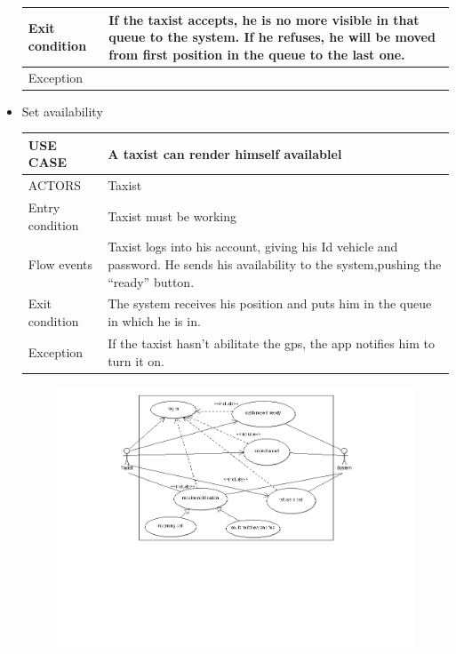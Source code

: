\begin{itemize}
\begin{center}
\begin{tabular}{ | l | p{11cm} |}
  	   Exit condition & If the taxist accepts, he is no more visible in that queue to the system.
If he refuses, he will be moved from first position in the queue to the last one.\\ \hline
  	   Exception &  \\ \hline
    \end{tabular}
\end{center}
\item Set availability
	\begin{center}
   	 \begin{tabular}{ | l | p{11cm} |}
   	 \hline
   	USE CASE & A taxist can render himself availablel\\ \hline
   	 ACTORS & Taxist \\ \hline
    	 Entry condition & Taxist must be working \\ \hline
    	 Flow events & Taxist logs into his account, giving his Id vehicle and password.
He sends his availability to the system,pushing the “ready” button.\\ \hline
  	   Exit condition & The system receives his position and puts him in the queue in which he is in.\\ \hline
  	   Exception &  If the taxist hasn’t abilitate the gps, the app notifies him to turn it on.\\ \hline
    \end{tabular}
\end{center}
	\begin{center}
	\begin{figure} [h]
    	\includegraphics [scale=0.5]{taxist.png}
	\end{figure}
	\end{center}
	\newpage


\end{itemize}






